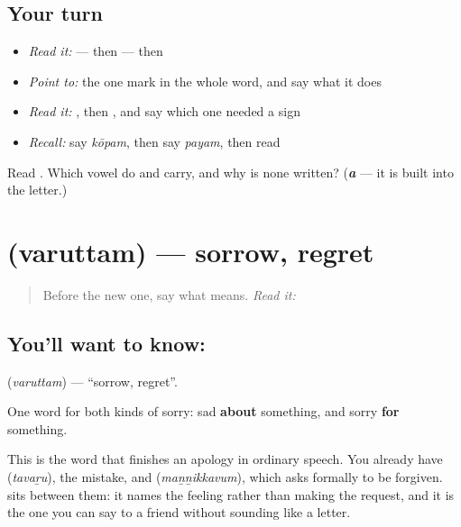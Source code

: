 \subsection*{Your turn}
\begin{itemize}
\raggedright
  \item \emph{Read it:} \textbf{} — then \textbf{} — then \textbf{}
  \item \emph{Point to:} the one mark in the whole word, and say what it does
  \item \emph{Read it:} \textbf{}, then \textbf{}, and say which one needed a sign
  \item \emph{Recall:} say \emph{kōpam}, then say \emph{payam}, then read \textbf{}
\end{itemize}

\begin{tcolorbox}[breakable,colback=teal!4,colframe=teal!35!black,title={Before you move on}]
Read \textbf{}. Which vowel do  and  carry, and why is none written? (\emph{\textbf{a}} — it is built into the letter.)
\end{tcolorbox}
\section[\texorpdfstring{\ta{வருத்தம்} (varuttam)}{வருத்தம் (varuttam)}]{ (varuttam) — sorrow, regret}

\label{lesson:TA-C72-sorrow}



\begin{quote}
Before the new one, say what \textbf{} means. \emph{Read it:} \textbf{}
\end{quote}

\subsection*{You'll want to know: }
\textbf{} (\emph{varuttam}) — \textquotedblleft{}sorrow, regret\textquotedblright{}.

One word for both kinds of sorry: sad \textbf{about} something, and sorry \textbf{for} something.

This is the word that finishes an apology in ordinary speech. You already have  (\emph{tavaṟu}), the mistake, and  (\emph{maṉṉikkavum}), which asks formally to be forgiven.  sits between them: it names the feeling rather than making the request, and it is the one you can say to a friend without sounding like a letter.

